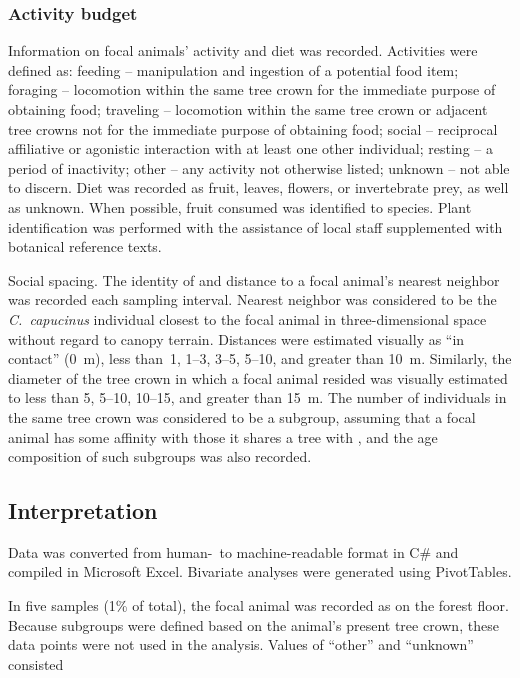 \documentclass{../../../coursework}
\begin{document}
\subsubsection{Activity budget}

Information on focal animals' activity and diet was recorded. Activities were
defined as: feeding -- manipulation and ingestion of a potential food item;
foraging -- locomotion within the same tree crown for the immediate purpose of
obtaining food; traveling -- locomotion within the same tree crown or adjacent
tree crowns not for the immediate purpose of obtaining food; social --
reciprocal affiliative or agonistic interaction with at least one other
individual; resting -- a period of inactivity; other -- any activity not
otherwise listed; unknown -- not able to discern. Diet was recorded as fruit,
leaves, flowers, or invertebrate prey, as well as unknown. When possible,
fruit consumed was identified to species. Plant identification was performed
with the assistance of local staff supplemented with botanical reference texts.

Social spacing. The identity of and distance to a focal animal's nearest
neighbor was recorded each sampling interval. Nearest neighbor was considered
to be the \emph{C.~capucinus} individual closest to the focal animal in
three-dimensional space without regard to canopy terrain. Distances were
estimated visually as ``in contact'' (\SI{0}{\metre}), less than~1,
\numrange{1}{3}, \numrange{3}{5}, \numrange{5}{10}, and greater than
\SI{10}{\metre}. Similarly, the diameter of the tree crown in which a focal
animal resided was visually estimated to less than 5, \numrange{5}{10},
\numrange{10}{15}, and greater than \SI{15}{\metre}. The number of individuals
in the same tree crown was considered to be a subgroup, assuming that a focal
animal has some affinity with those it shares a tree with
\parencite{Bezanson2008}, and the age composition of such subgroups was also
recorded.

\subsection{Interpretation}

Data was converted from human-\ to machine-readable format in C\# and compiled
in Microsoft Excel. Bivariate analyses were generated using PivotTables.

In five samples (1\% of total), the focal animal was recorded as on the forest
floor. Because subgroups were defined based on the animal's present tree crown,
these data points were not used in the analysis. Values of ``other'' and
``unknown'' consisted
\end{document}
